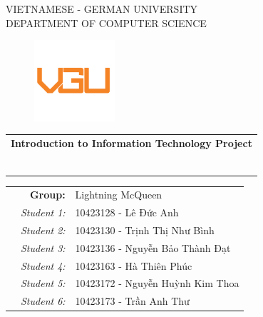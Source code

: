 \documentclass[a4paper,11pt]{article}
\theoremstyle{mytheor}
\begin{document}
\begin{titlepage}
\begin{center}
VIETNAMESE - GERMAN UNIVERSITY \\
DEPARTMENT OF COMPUTER SCIENCE
\end{center}

\vspace{1cm}

\begin{figure}[h!]
\begin{center}
\includegraphics[width=3cm]{vgu_logo.png}
\end{center}
\end{figure}

\vspace{2cm}


\begin{center}
\begin{tabular}{c}
\multicolumn{1}{c}{\textbf{{\Large Introduction to Information Technology Project}}}



~~\\

\\
\multicolumn{1}{l}{\textbf{{\Large}}}\\
\\
\textbf{{\Large}}\\

\\
\\

\end{tabular}
\end{center}

\vspace{2cm}

\begin{table}[h]
\begin{tabular}{rrl}
&\textbf{Group:} & Lightning McQueen\\
\hspace{5.1cm} 
&\textit{Student 1: } & 10423128 - Lê Đức Anh\\
&\textit{Student 2: } & 10423130 - Trịnh Thị Như Bình\\
&\textit{Student 3: } & 10423136 - Nguyễn Bảo Thành Đạt\\
&\textit{Student 4: } & 10423163 - Hà Thiên Phúc\\
&\textit{Student 5: } & 10423172 - Nguyễn Huỳnh Kim Thoa\\
&\textit{Student 6: } & 10423173 - Trần Anh Thư\\



\end{tabular}
\end{table}
\end{titlepage}
\end{document}
